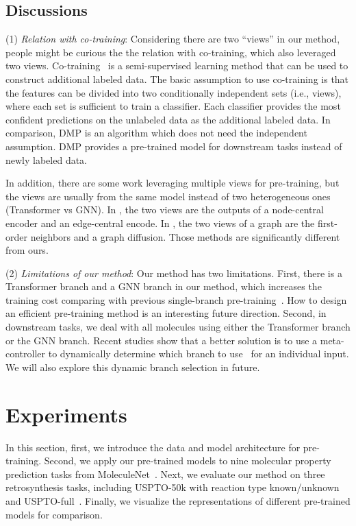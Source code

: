 \documentclass{article}
\newcommand{\ourM}{DMP}
\begin{document}
\subsection{Discussions}
(1) {\it Relation with co-training}: Considering there are two ``views'' in our method, people might be curious the the relation with co-training, which also leveraged two views. Co-training~\cite{blum1998combining} is a semi-supervised learning method that can be used to construct additional labeled data. The basic assumption to use co-training is that the features can be divided into two conditionally independent sets (i.e., views), where each set is sufficient to train a classifier. Each classifier provides the most confident predictions on the unlabeled data as the additional labeled data. 
In comparison, \ourM{} is an algorithm which does not need the independent assumption. \ourM{} provides a pre-trained model for downstream tasks instead of newly labeled data.

In addition, there are some work leveraging multiple views for pre-training, but the views are usually from the same model instead of two heterogeneous ones (Transformer vs GNN). In \citep{ma2020multi}, the two views are the outputs of a node-central encoder and an edge-central encode. In \citep{hassani2020contrastive}, the two views of a graph are the first-order neighbors
and a graph diffusion. Those methods are significantly different from ours.

(2) {\it Limitations of our method}:\label{discussion_limitation} Our method has two limitations. First, there is a Transformer branch and a GNN branch in our method, which increases the training cost comparing with previous single-branch pre-training~\cite{chithrananda2020chemberta,wang2021molclr}. How to design an efficient pre-training method is an interesting future direction. Second, in downstream tasks, we deal with all molecules using either the Transformer branch or the GNN branch. Recent studies show that a better solution is to use a meta-controller to dynamically determine which branch to use~\cite{zhu2021iot,elbayad2019depth} for an individual input. We will also explore this dynamic branch selection in future. 



  

 
\section{Experiments}
In this section, first, we introduce the data and model architecture for pre-training. Second, we apply our pre-trained models to nine molecular property prediction tasks from MoleculeNet~\cite{wu2018moleculenet}. Next, we evaluate our method on three retrosynthesis tasks, including USPTO-50k with reaction type known/unknown and USPTO-full~\cite{tetko2020state}. Finally, we visualize the representations of different pre-trained models for comparison.
\end{document}
